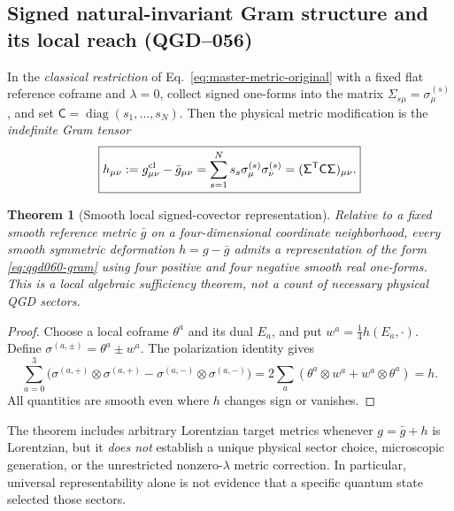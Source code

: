 \documentclass[11pt,a4paper]{article}
\newtheorem{theorem}{Theorem}[section]
\begin{document}
\subsection{Signed natural-invariant Gram structure and its local reach (QGD--056)}\label{sec:qgd060-gram}
In the \emph{classical restriction} of Eq.~\eqref{eq:master-metric-original} with a fixed flat reference coframe and $\lambda=0$, collect signed one-forms into the matrix $\mathsf\Sigma_{s\mu}=\sigma_\mu^{(s)}$, and set $\mathsf C=\operatorname{diag}(s_1,\dots,s_N)$. Then the physical metric modification is the \emph{indefinite Gram tensor}
\begin{equation}\label{eq:qgd060-gram}
 \boxed{h_{\mu\nu}:=g^{\rm cl}_{\mu\nu}-\bar g_{\mu\nu}
 =\sum_{s=1}^N s_s\sigma_\mu^{(s)}\sigma_\nu^{(s)}
 =(\mathsf\Sigma^{\mathsf T}\mathsf C\mathsf\Sigma)_{\mu\nu}.}
\end{equation}
\begin{theorem}[Smooth local signed-covector representation]\label{thm:qgd060-eight}
Relative to a fixed smooth reference metric $\bar g$ on a four-dimensional coordinate neighborhood, every smooth symmetric deformation $h=g-\bar g$ admits a representation of the form \eqref{eq:qgd060-gram} using four positive and four negative smooth real one-forms.  This is a \emph{local algebraic sufficiency theorem}, not a count of necessary physical QGD sectors.
\end{theorem}
\begin{proof}
Choose a local coframe $\theta^a$ and its dual $E_a$, and put $w^a=\frac14 h(E_a,\cdot)$. Define $\sigma^{(a,\pm)}=\theta^a\pm w^a$. The polarization identity gives
\begin{equation}\label{eq:qgd060-eight}
 \boxed{\sum_{a=0}^3\bigl(\sigma^{(a,+)}\!\otimes\sigma^{(a,+)}-
 \sigma^{(a,-)}\!\otimes\sigma^{(a,-)}\bigr)
 =2\sum_a(\theta^a\!\otimes w^a+w^a\!\otimes\theta^a)=h.}
\end{equation}
All quantities are smooth even where $h$ changes sign or vanishes.
\end{proof}
The theorem includes arbitrary Lorentzian target metrics whenever $g=\bar g+h$ is Lorentzian, but it \emph{does not} establish a unique physical sector choice, microscopic generation, or the unrestricted nonzero-$\lambda$ metric correction.  In particular, universal representability alone is not evidence that a specific quantum state selected those sectors.
\end{document}
